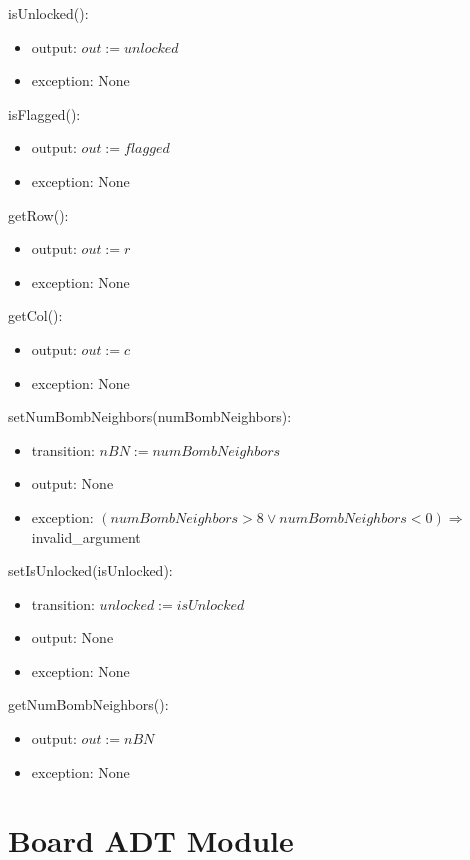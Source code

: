 \documentclass[12pt]{article}
\begin{document}
\noindent isUnlocked():
\begin{itemize}
\item output: $out := unlocked$
\item exception: None
\end{itemize}

\noindent isFlagged():
\begin{itemize}
\item output: $out := flagged$
\item exception: None
\end{itemize}

\noindent getRow():
\begin{itemize}
\item output: $out := r$
\item exception: None
\end{itemize}

\noindent getCol():
\begin{itemize}
\item output: $out := c$
\item exception: None
\end{itemize}

\noindent setNumBombNeighbors(numBombNeighbors):
\begin{itemize}
\item transition: $nBN:=numBombNeighbors$
\item output: None
\item exception: $(numBombNeighbors > 8 \lor numBombNeighbors < 0) \Rightarrow$ invalid\_argument
\end{itemize}

\noindent setIsUnlocked(isUnlocked):
\begin{itemize}
\item transition: $unlocked:=isUnlocked$
\item output: None
\item exception: None
\end{itemize}

\noindent getNumBombNeighbors():
\begin{itemize}
\item output: $out := nBN$
\item exception: None
\end{itemize}

\newpage

\section {Board ADT Module}
\end{document}
